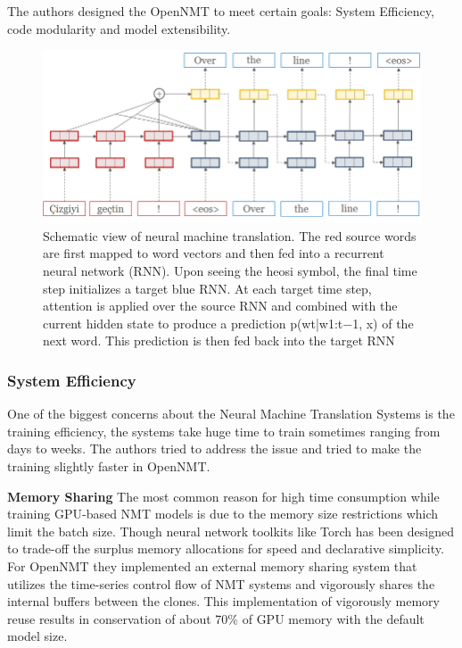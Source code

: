 The authors designed the OpenNMT to meet certain goals: System Efficiency, code modularity and model extensibility. 

\begin{figure}
\includegraphics[width=\textwidth]{figures/openmt.png}
\caption{ Schematic view of neural machine translation. The red source words are first mapped to
word vectors and then fed into a recurrent neural network (RNN). Upon seeing the heosi symbol, the final
time step initializes a target blue RNN. At each target time step, attention is applied over the source RNN
and combined with the current hidden state to produce a prediction p(wt|w1:t−1, x) of the next word. This
prediction is then fed back into the target RNN} \label{fig1}
\end{figure}


\subsubsection{System Efficiency}

One of the biggest concerns about the Neural Machine Translation Systems is the training efficiency, the systems take huge time to train sometimes ranging from days to weeks. The authors tried to address the issue and tried to make the training slightly faster in OpenNMT. 

\textbf{Memory Sharing} The most common reason for high time consumption while training GPU-based NMT models is due to the memory size restrictions which limit the batch size. Though neural network toolkits like Torch has been designed to trade-off the surplus memory allocations for speed and declarative simplicity. For OpenNMT they implemented an external memory sharing system that utilizes the time-series control flow of NMT systems and vigorously shares the internal buffers between the clones. This implementation of vigorously memory reuse results in conservation of about 70\% of GPU memory with the default model size.

